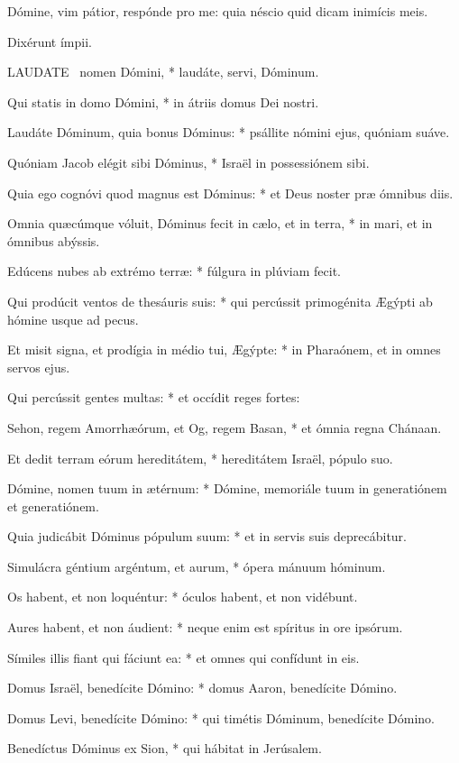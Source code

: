  Dómine, vim pátior, respónde pro me: quia néscio quid dicam inimícis meis.

 Dixérunt ímpii.


\lettrine[lines=2]{L}{AUDATE} \textdagger\ nomen Dómini, * laudáte, servi, Dóminum.

Qui statis in domo Dómini, * in átriis domus Dei nostri.

Laudáte Dóminum, quia bonus Dóminus: * psállite nómini ejus, quóniam suáve.

Quóniam Jacob elégit sibi Dóminus, * Israël in possessiónem sibi.

Quia ego cognóvi quod magnus est Dóminus: * et Deus noster præ ómnibus diis.

Omnia quæcúmque vóluit, Dóminus fecit in cælo, et in terra, * in mari, et in ómnibus abýssis.

Edúcens nubes ab extrémo terræ: * fúlgura in plúviam fecit.

Qui prodúcit ventos de thesáuris suis: * qui percússit primogénita Ægýpti ab hómine usque ad pecus.

Et misit signa, et prodígia in médio tui, Ægýpte: * in Pharaónem, et in omnes servos ejus.

Qui percússit gentes multas: * et occídit reges fortes:

Sehon, regem Amorrhæórum, et Og, regem Basan, * et ómnia regna Chánaan.

Et dedit terram eórum hereditátem, * hereditátem Israël, pópulo suo.

Dómine, nomen tuum in ætérnum: * Dómine, memoriále tuum in generatiónem et generatiónem.

Quia judicábit Dóminus pópulum suum: * et in servis suis deprecábitur.

Simulácra géntium argéntum, et aurum, * ópera mánuum hóminum.

Os habent, et non loquéntur: * óculos habent, et non vidébunt.

Aures habent, et non áudient: * neque enim est spíritus in ore ipsórum.

Símiles illis fiant qui fáciunt ea: * et omnes qui confídunt in eis.

Domus Israël, benedícite Dómino: * domus Aaron, benedícite Dómino.

Domus Levi, benedícite Dómino: * qui timétis Dóminum, benedícite Dómino.

Benedíctus Dóminus ex Sion, * qui hábitat in Jerúsalem.

